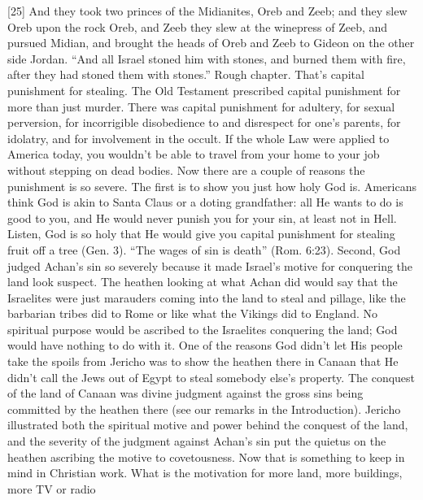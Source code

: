 [25] \textcolor[rgb]{0.00,0.00,1.00}{And they took two princes of the Midianites, Oreb and Zeeb; and they slew Oreb upon the rock Oreb, and Zeeb they slew at the winepress of Zeeb, and pursued Midian, and brought the heads of Oreb and Zeeb to Gideon on the other side Jordan.}%
“And all Israel stoned him with stones, and burned them with fire, after they had
stoned them with stones.” Rough chapter. That’s capital punishment for stealing. The Old
Testament prescribed capital punishment for
more than just murder. There was capital
punishment for adultery, for sexual perversion,
for incorrigible disobedience to and disrespect
for one’s parents, for idolatry, and for
involvement in the occult. If the whole Law
were applied to America today, you wouldn’t
be able to travel from your home to your job
without stepping on dead bodies.
Now there are a couple of reasons the
punishment is so severe. The first is to show
you just how holy God is. Americans think God
is akin to Santa Claus or a doting grandfather:
all He wants to do is good to you, and He
would never punish you for your sin, at least
not in Hell. Listen, God is so holy that He
would give you capital punishment for stealing
fruit off a tree (Gen. 3). “The wages of sin is
death” (Rom. 6:23).
Second, God judged Achan’s sin so
severely because it made Israel’s motive for
conquering the land look suspect. The heathen
looking at what Achan did would say that the
Israelites were just marauders coming into the
land to steal and pillage, like the barbarian tribes
did to Rome or like what the Vikings did to
England. No spiritual purpose would be
ascribed to the Israelites conquering the land;
God would have nothing to do with it.
One of the reasons God didn’t let His
people take the spoils from Jericho was to show
the heathen there in Canaan that He didn’t call
the Jews out of Egypt to steal somebody else’s
property. The conquest of the land of Canaan
was divine judgment against the gross sins being
committed by the heathen there (see our
remarks in the Introduction). Jericho illustrated
both the spiritual motive and power behind the
conquest of the land, and the severity of the
judgment against Achan’s sin put the quietus on
the heathen ascribing the motive to
covetousness.
Now that is something to keep in mind in
Christian work. What is the motivation for more
land, more buildings, more TV or radio
